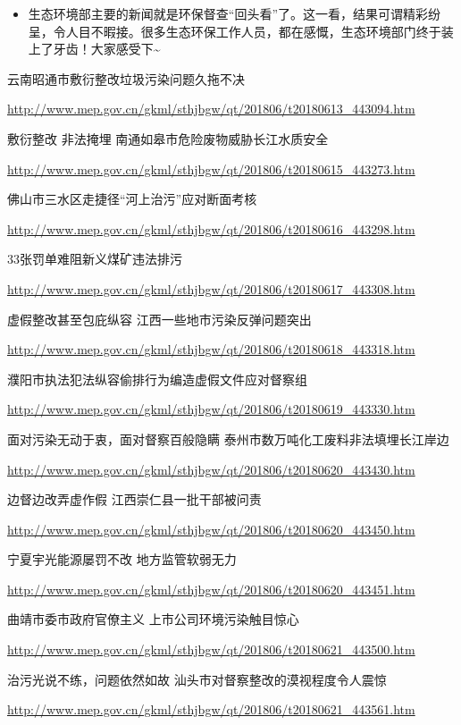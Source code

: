 \documentclass[
]{book}
\providecommand{\tightlist}{%
  \setlength{\itemsep}{0pt}\setlength{\parskip}{0pt}}
\begin{document}
\begin{itemize}
\tightlist
\item
  生态环境部主要的新闻就是环保督查``回头看''了。这一看，结果可谓精彩纷呈，令人目不暇接。很多生态环保工作人员，都在感慨，生态环境部门终于装上了牙齿！大家感受下\textasciitilde{}
\end{itemize}

云南昭通市敷衍整改垃圾污染问题久拖不决

\url{http://www.mep.gov.cn/gkml/sthjbgw/qt/201806/t20180613_443094.htm}

敷衍整改 非法掩埋 南通如皋市危险废物威胁长江水质安全

\url{http://www.mep.gov.cn/gkml/sthjbgw/qt/201806/t20180615_443273.htm}

佛山市三水区走捷径``河上治污''应对断面考核

\url{http://www.mep.gov.cn/gkml/sthjbgw/qt/201806/t20180616_443298.htm}

33张罚单难阻新义煤矿违法排污

\url{http://www.mep.gov.cn/gkml/sthjbgw/qt/201806/t20180617_443308.htm}

虚假整改甚至包庇纵容 江西一些地市污染反弹问题突出

\url{http://www.mep.gov.cn/gkml/sthjbgw/qt/201806/t20180618_443318.htm}

濮阳市执法犯法纵容偷排行为编造虚假文件应对督察组

\url{http://www.mep.gov.cn/gkml/sthjbgw/qt/201806/t20180619_443330.htm}

面对污染无动于衷，面对督察百般隐瞒 泰州市数万吨化工废料非法填埋长江岸边

\url{http://www.mep.gov.cn/gkml/sthjbgw/qt/201806/t20180620_443430.htm}

边督边改弄虚作假 江西崇仁县一批干部被问责

\url{http://www.mep.gov.cn/gkml/sthjbgw/qt/201806/t20180620_443450.htm}

宁夏宇光能源屡罚不改 地方监管软弱无力

\url{http://www.mep.gov.cn/gkml/sthjbgw/qt/201806/t20180620_443451.htm}

曲靖市委市政府官僚主义 上市公司环境污染触目惊心

\url{http://www.mep.gov.cn/gkml/sthjbgw/qt/201806/t20180621_443500.htm}

治污光说不练，问题依然如故 汕头市对督察整改的漠视程度令人震惊

\url{http://www.mep.gov.cn/gkml/sthjbgw/qt/201806/t20180621_443561.htm}
\end{document}
